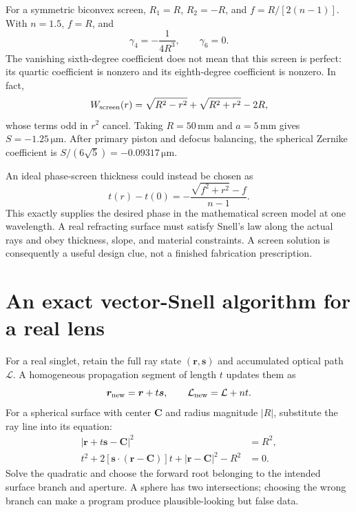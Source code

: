 For a symmetric biconvex screen, $R_1=R$, $R_2=-R$, and
$f=R/[2(n-1)]$. With $n=1.5$, $f=R$, and
\begin{equation}
 \gamma_4=-\frac1{4R^3},\qquad \gamma_6=0.
\end{equation}
The vanishing sixth-degree coefficient does not mean that this screen is
perfect: its quartic coefficient is nonzero and its eighth-degree coefficient
is nonzero. In fact,
\begin{equation}
 W_{\rm screen}(r)=\sqrt{R^2-r^2}+\sqrt{R^2+r^2}-2R,
\end{equation}
whose terms odd in $r^2$ cancel. Taking $R=50\,\mathrm{mm}$ and
$a=5\,\mathrm{mm}$ gives $S=-1.25\,\mathrm{\mu m}$.
After primary piston and defocus balancing, the spherical Zernike coefficient
is $S/(6\sqrt5)=-0.09317\,\mathrm{\mu m}$.

An ideal phase-screen thickness could instead be chosen as
\begin{equation}
 t(r)-t(0)=-\frac{\sqrt{f^2+r^2}-f}{n-1}.
\end{equation}
This exactly supplies the desired phase in the mathematical screen model at
one wavelength. A real refracting surface must satisfy Snell's law along the
actual rays and obey thickness, slope, and material constraints. A screen
solution is consequently a useful design clue, not a finished fabrication
prescription.

\section{An exact vector-Snell algorithm for a real lens}
For a real singlet, retain the full ray state $(\bm r,\bm s)$ and accumulated
optical path $\mathcal L$. A homogeneous propagation segment of length $t$
updates them as
\begin{equation}
 \bm r_{\rm new}=\bm r+t\bm s,\qquad
 \mathcal L_{\rm new}=\mathcal L+nt.
\end{equation}
For a spherical surface with center $\bm C$ and radius magnitude $|R|$,
substitute the ray line into its equation:
\begin{align}
 |\bm r+t\bm s-\bm C|^2&=R^2,\\
 t^2+2[\bm s\cdot(\bm r-\bm C)]t
                  +|\bm r-\bm C|^2-R^2&=0.
\end{align}
Solve the quadratic and choose the forward root belonging to the intended
surface branch and aperture. A sphere has two intersections; choosing the
wrong branch can make a program produce plausible-looking but false data.

